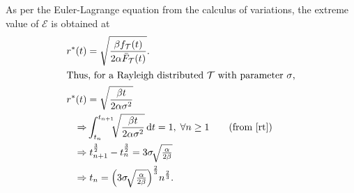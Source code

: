 As per the Euler-Lagrange equation from the calculus of variations\cite{calcVariation2,calcVariation1}, the extreme value of $\mathcal{E}$ is obtained at 
\begin{alignat}{1}
r^*(t)&=\sqrt{\dfrac{\beta f_\mathcal{T}(t)}{2\alpha\bar{F}_\mathcal{T}(t)}}.\\
\intertext{Thus, for a Rayleigh distributed $\mathcal{T}$ with parameter $\sigma$,}
r^*(t)&=\sqrt{\dfrac{\beta t}{2\alpha\sigma^2}}\\
\Rightarrow &\int_{t_n}^{t_{n+1}}\!\!\!\sqrt{\dfrac{\beta t}{2\alpha\sigma^2}}\,\mathrm{d}t=1,\;\forall n\geq1\nonumber\tag{from \eqref{rt}}\\
\Rightarrow &\;t_{n+1}^{\frac{3}{2}}-t_{n}^{\frac{3}{2}}=3\sigma\!\sqrt{\tfrac{\alpha}{2\beta}}\nonumber\\
\Rightarrow &\;t_n=\Big(3\sigma\!\sqrt{\tfrac{\alpha}{2\beta}}\Big)^{\frac{2}{3}}n^{\frac{2}{3}}.\label{tnFinal}
\end{alignat}

